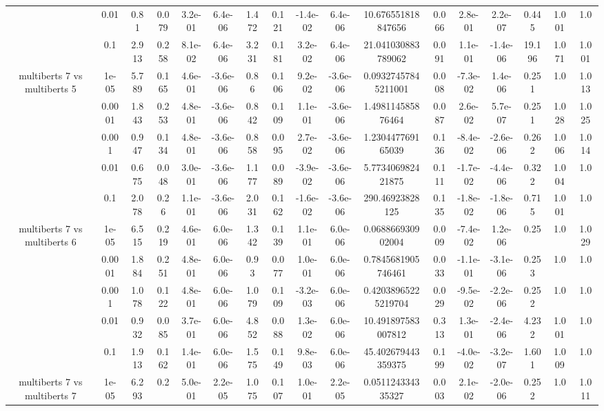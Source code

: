 \begin{tabular}{|c|c|c|c|c|c|c|c|c|c|c|c|c|c|c|c|c|}
 & 0.01 & 0.81 & 0.079 & 3.2e-01 & 6.4e-06 & 1.472 & 0.121 & -1.4e-02 & 6.4e-06 & 10.676551818847656 & 0.066 & 2.8e-01 & 2.2e-07 & 0.445 & 1.001 & 1.0 \\
 & 0.1 & 2.913 & 0.258 & 8.1e-02 & 6.4e-06 & 3.231 & 0.181 & 3.2e-02 & 6.4e-06 & 21.041030883789062 & 0.091 & 1.1e-01 & -1.4e-06 & 19.196 & 1.071 & 1.001 \\
\hline
\multirow{5}{*}{multiberts 7 vs multiberts 5} & 1e-05 & 5.789 & 0.165 & 4.6e-01 & -3.6e-06 & 0.86 & 0.106 & 9.2e-02 & -3.6e-06 & 0.09327457845211001 & 0.008 & -7.3e-02 & 1.4e-06 & 0.251 & 1.0 & 1.013 \\
 & 0.0001 & 1.843 & 0.253 & 4.8e-01 & -3.6e-06 & 0.842 & 0.109 & 1.1e-01 & -3.6e-06 & 1.498114585876464 & 0.087 & 2.6e-02 & 5.7e-07 & 0.251 & 1.028 & 1.025 \\
 & 0.001 & 0.947 & 0.134 & 4.8e-01 & -3.6e-06 & 0.858 & 0.095 & 2.7e-02 & -3.6e-06 & 1.230447769165039 & 0.136 & -8.4e-02 & -2.6e-06 & 0.262 & 1.006 & 1.014 \\
 & 0.01 & 0.675 & 0.048 & 3.0e-01 & -3.6e-06 & 1.177 & 0.089 & -3.9e-02 & -3.6e-06 & 5.773406982421875 & 0.111 & -1.7e-02 & -4.4e-06 & 0.322 & 1.004 & 1.0 \\
 & 0.1 & 2.078 & 0.26 & 1.1e-01 & -3.6e-06 & 2.031 & 0.162 & -1.6e-02 & -3.6e-06 & 290.46923828125 & 0.135 & -1.8e-02 & -1.8e-06 & 0.715 & 1.001 & 1.0 \\
\hline
\multirow{5}{*}{multiberts 7 vs multiberts 6} & 1e-05 & 6.515 & 0.219 & 4.6e-01 & 6.0e-06 & 1.342 & 0.139 & 1.1e-01 & 6.0e-06 & 0.068866930902004 & 0.009 & -7.4e-02 & 1.2e-06 & 0.25 & 1.0 & 1.029 \\
 & 0.0001 & 1.884 & 0.251 & 4.8e-01 & 6.0e-06 & 0.93 & 0.077 & 1.0e-01 & 6.0e-06 & 0.7845681905746461 & 0.033 & -1.1e-01 & -3.1e-06 & 0.253 & 1.0 & 1.0 \\
 & 0.001 & 1.078 & 0.122 & 4.8e-01 & 6.0e-06 & 1.079 & 0.109 & -3.2e-03 & 6.0e-06 & 0.42038965225219704 & 0.029 & -9.5e-02 & -2.2e-06 & 0.252 & 1.0 & 1.0 \\
 & 0.01 & 0.932 & 0.085 & 3.7e-01 & 6.0e-06 & 4.852 & 0.088 & 1.3e-02 & 6.0e-06 & 10.491897583007812 & 0.313 & 1.3e-01 & -2.4e-06 & 4.232 & 1.001 & 1.0 \\
 & 0.1 & 1.913 & 0.162 & 1.4e-01 & 6.0e-06 & 1.575 & 0.149 & 9.8e-03 & 6.0e-06 & 45.402679443359375 & 0.199 & -4.0e-02 & -3.2e-07 & 1.601 & 1.009 & 1.0 \\
\hline
\multirow{5}{*}{multiberts 7 vs multiberts 7} & 1e-05 & 6.293 & 0.2 & 5.0e-01 & 2.2e-05 & 1.075 & 0.107 & 1.0e-01 & 2.2e-05 & 0.051124334335327 & 0.003 & 2.1e-02 & -2.0e-06 & 0.252 & 1.0 & 1.011 \\

\end{tabular}
